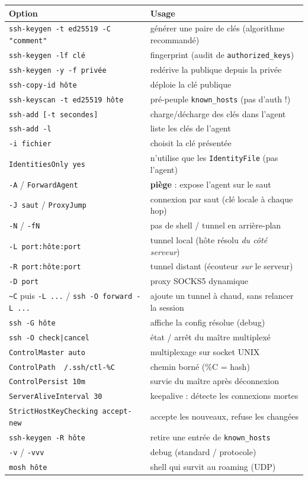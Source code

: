 \documentclass[a4paper,10pt]{exam}
\begin{document}
\begin{center}
\small
\begin{tabular}{p{} p{}}
\hline
\textbf{Option} & \textbf{Usage} \\
\hline
\texttt{ssh-keygen -t ed25519 -C "comment"} & générer une paire de clés (algorithme recommandé) \\
\texttt{ssh-keygen -lf clé} & fingerprint (audit de \texttt{authorized\_keys}) \\
\texttt{ssh-keygen -y -f privée} & redérive la publique depuis la privée \\
\texttt{ssh-copy-id hôte} & déploie la clé publique \\
\texttt{ssh-keyscan -t ed25519 hôte} & pré-peuple \texttt{known\_hosts} (pas d'auth !) \\
\texttt{ssh-add [-t secondes]} & charge/décharge des clés dans l'agent \\
\texttt{ssh-add -l} & liste les clés de l'agent \\
\texttt{-i fichier} & choisit la clé présentée \\
\texttt{IdentitiesOnly yes} & n'utilise que les \texttt{IdentityFile} (pas l'agent) \\
\texttt{-A} / \texttt{ForwardAgent} & \textbf{piège} : expose l'agent sur le saut \\
\texttt{-J saut} / \texttt{ProxyJump} & connexion par saut (clé locale à chaque hop) \\
\texttt{-N} / \texttt{-fN} & pas de shell / tunnel en arrière-plan \\
\texttt{-L port:hôte:port} & tunnel local (hôte résolu \emph{du côté serveur}) \\
\texttt{-R port:hôte:port} & tunnel distant (écouteur \emph{sur} le serveur) \\
\texttt{-D port} & proxy SOCKS5 dynamique \\
\texttt{\textasciitilde C} puis \texttt{-L ...} / \texttt{ssh -O forward -L ...} & ajoute un tunnel à chaud, sans relancer la session \\
\texttt{ssh -G hôte} & affiche la config résolue (debug) \\
\texttt{ssh -O check|cancel} & état / arrêt du maître multiplexé \\
\texttt{ControlMaster auto} & multiplexage sur socket UNIX \\
\texttt{ControlPath ~/.ssh/ctl-\%C} & chemin borné (\%C = hash) \\
\texttt{ControlPersist 10m} & survie du maître après déconnexion \\
\texttt{ServerAliveInterval 30} & keepalive : détecte les connexions mortes \\
\texttt{StrictHostKeyChecking accept-new} & accepte les nouveaux, refuse les changées \\
\texttt{ssh-keygen -R hôte} & retire une entrée de \texttt{known\_hosts} \\
\texttt{-v} / \texttt{-vvv} & debug (standard / protocole) \\
\texttt{mosh hôte} & shell qui survit au roaming (UDP) \\
\hline
\end{tabular}
\end{center}
\end{document}
